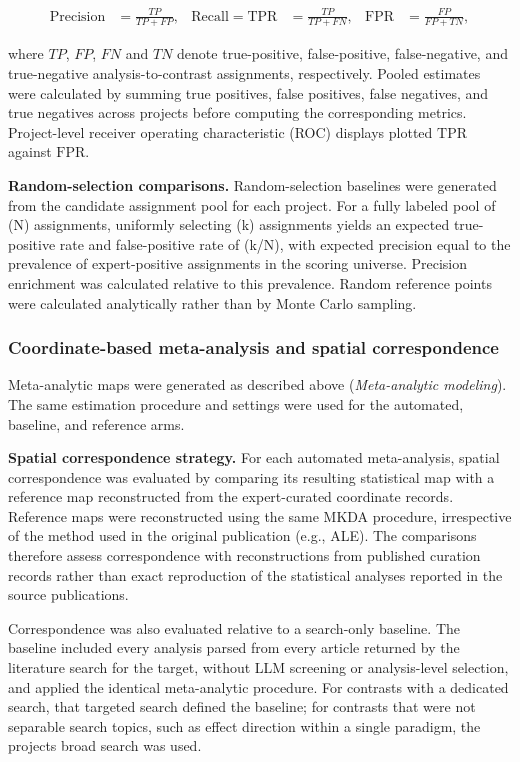 \begin{equation*}
\begin{aligned}
\mathrm{Precision} &= \frac{TP}{TP + FP}, &
\mathrm{Recall} = \mathrm{TPR} &= \frac{TP}{TP + FN}, &
\mathrm{FPR} &= \frac{FP}{FP + TN},
\end{aligned}
\end{equation*}

where $TP$, $FP$, $FN$ and $TN$ denote true-positive, false-positive, false-negative, and true-negative analysis-to-contrast assignments, respectively. Pooled estimates were calculated by summing true positives, false positives, false negatives, and true negatives across projects before computing the corresponding metrics. Project-level receiver operating characteristic (ROC) displays plotted $\mathrm{TPR}$ against $\mathrm{FPR}$.

\textbf{Random-selection comparisons.} Random-selection baselines were generated from the candidate assignment pool for each project. For a fully labeled pool of (N) assignments, uniformly selecting (k) assignments yields an expected true-positive rate and false-positive rate of (k/N), with expected precision equal to the prevalence of expert-positive assignments in the scoring universe. Precision enrichment was calculated relative to this prevalence. Random reference points were calculated analytically rather than by Monte Carlo sampling.

\subsubsection{Coordinate-based meta-analysis and spatial correspondence}

Meta-analytic maps were generated as described above (\emph{Meta-analytic modeling}). The same estimation procedure and settings were used for the automated, baseline, and reference arms.

\textbf{Spatial correspondence strategy.} For each automated meta-analysis, spatial correspondence was evaluated by comparing its resulting statistical map with a reference map reconstructed from the expert-curated coordinate records. Reference maps were reconstructed using the same MKDA procedure, irrespective of the method used in the original publication (e.g., ALE). The comparisons therefore assess correspondence with reconstructions from published curation records rather than exact reproduction of the statistical analyses reported in the source publications.

Correspondence was also evaluated relative to a search-only baseline. The baseline included every analysis parsed from every article returned by the literature search for the target, without LLM screening or analysis-level selection, and applied the identical meta-analytic procedure. For contrasts with a dedicated search, that targeted search defined the baseline; for contrasts that were not separable search topics, such as effect direction within a single paradigm, the project\textquotesingle s broad search was used.

